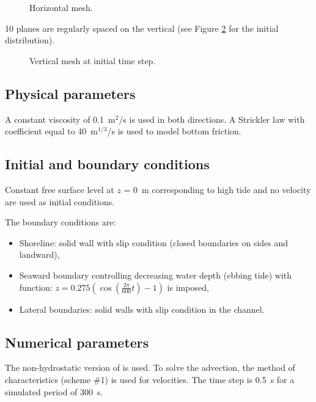 \begin{figure}[H]
 \centering
  \caption{Horizontal mesh.}\label{fig:vasque:MeshH}
\end{figure}

10 planes are regularly spaced on the vertical (see Figure \ref{fig:vasque:MeshV}
for the initial distribution).

\begin{figure}[H]
 \centering
  \caption{Vertical mesh at initial time step.}\label{fig:vasque:MeshV}
\end{figure}

\subsection{Physical parameters}

A constant viscosity of 0.1~m$^2$/s is used in both directions.
A Strickler law with coefficient equal to 40~m$^{1/3}$/s is used to model bottom
friction.

\subsection{Initial and boundary conditions}

Constant free surface level at $z$ = 0~m corresponding to high tide
and no velocity are used as initial conditions.

The boundary conditions are:
\begin{itemize}
\item Shoreline: solid wall with slip condition (closed boundaries on sides and landward),
\item Seaward boundary controlling decreasing water depth (ebbing tide) with
 function:
$z = 0.275\left( \cos(\frac{2\pi}{600}t) -1 \right)$ is imposed,
\item Lateral boundaries: solid walls with slip condition in the channel.
\end{itemize}

\subsection{Numerical parameters}

The non-hydrostatic version of  is used.
To solve the advection, the method of characteristics (scheme \#1) is used for
velocities.
The time step is 0.5~s for a simulated period of 300~s.

